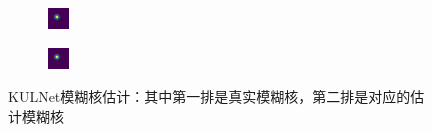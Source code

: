 \begin{figure}[htbp]
\begin{subfigure}{0.24\textwidth}
    \end{subfigure}
    \hfill
    \begin{subfigure}{0.24\textwidth}
        \includegraphics[width=\linewidth]{imgs/kernels/kul_ker_3_fake.png}
    \end{subfigure}
    \hfill
    \begin{subfigure}{0.24\textwidth}
        \includegraphics[width=\linewidth]{imgs/kernels/kul_ker_5_fake.png}
    \end{subfigure}
    \caption{KULNet模糊核估计：其中第一排是真实模糊核，第二排是对应的估计模糊核}
    \label{fig:ker_kul}
\end{figure}

